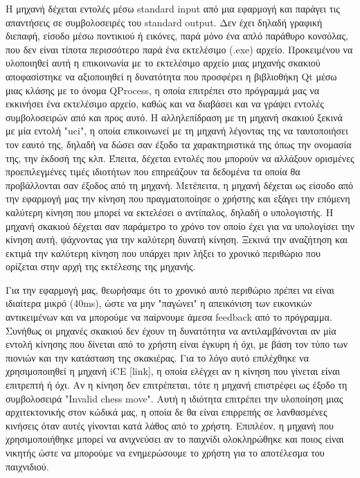 Η μηχανή δέχεται εντολές μέσω standard input από μια εφαρμογή και παράγει τις απαντήσεις σε συμβολοσειρές του standard output. Δεν έχει δηλαδή γραφική διεπαφή, είσοδο μέσω ποντικιού ή εικόνες, παρά μόνο ένα απλό παράθυρο κονσόλας, που δεν είναι τίποτα περισσότερο παρά ένα εκτελέσιμο (.exe) αρχείο. Προκειμένου να υλοποιηθεί αυτή η επικοινωνία με το εκτελέσιμο αρχείο μιας μηχανής σκακιού αποφασίστηκε να αξιοποιηθεί η δυνατότητα που προσφέρει η βιβλιοθήκη Qt μέσω μιας κλάσης με το όνομα QProcess, η οποία επιτρέπει στο πρόγραμμά μας να εκκινήσει ένα εκτελέσιμο αρχείο, καθώς και να διαβάσει και να γράψει εντολές συμβολοσειρών από και προς αυτό. Η αλληλεπίδραση με τη μηχανή σκακιού ξεκινά με μία εντολή "uci", η οποία επικοινωνεί με τη μηχανή λέγοντας της να ταυτοποιήσει τον εαυτό της, δηλαδή να δώσει σαν έξοδο τα χαρακτηριστικά της όπως την ονομασία της, την έκδοσή της κλπ.  Έπειτα, δέχεται εντολές που μπορούν να αλλάξουν ορισμένες προεπιλεγμένες τιμές ιδιοτήτων που επηρεάζουν τα δεδομένα τα οποία θα προβάλλονται σαν έξοδος από τη μηχανή. Μετέπειτα, η μηχανή δέχεται ως είσοδο από την εφαρμογή μας την κίνηση που πραγματοποίησε ο χρήστης και εξάγει την επόμενη καλύτερη κίνηση που μπορεί να εκτελέσει ο αντίπαλος, δηλαδή ο υπολογιστής.
Η μηχανή σκακιού δέχεται σαν παράμετρο το χρόνο τον οποίο έχει για να υπολογίσει την κίνηση αυτή, ψάχνοντας για την καλύτερη δυνατή κίνηση. Ξεκινά την αναζήτηση και εκτιμά την καλύτερη κίνηση που υπάρχει πριν λήξει το χρονικό περιθώριο που ορίζεται στην αρχή της εκτέλεσης της μηχανής. 

Για την εφαρμογή μας, θεωρήσαμε ότι το χρονικό αυτό περιθώριο πρέπει να είναι ιδιαίτερα μικρό (40ms), ώστε να μην "παγώνει" η απεικόνιση των εικονικών αντικειμένων και να μπορούμε να παίρνουμε άμεσα feedback από το πρόγραμμα. Συνήθως οι μηχανές σκακιού δεν έχουν τη δυνατότητα να αντιλαμβάνονται αν μία εντολή κίνησης που δίνεται από το χρήστη είναι έγκυρη ή όχι, με βάση τον τύπο των πιονιών και την κατάσταση της σκακιέρας. Για το λόγο αυτό επιλέχθηκε να χρησιμοποιηθεί η μηχανή iCE [link], η οποία ελέγχει αν η κίνηση που γίνεται είναι επιτρεπτή ή όχι. Αν η κίνηση δεν επιτρέπεται, τότε η μηχανή επιστρέφει ως έξοδο τη συμβολοσειρά "Invalid chess move". Αυτή η ιδιότητα επιτρέπει την υλοποίηση μιας αρχιτεκτονικής στον κώδικά μας, η οποία δε θα είναι επιρρεπής σε λανθασμένες κινήσεις όταν αυτές γίνονται κατά λάθος από το χρήστη. Επιπλέον, η μηχανή που χρησιμοποιήθηκε μπορεί να ανιχνεύσει αν το παιχνίδι ολοκληρώθηκε και ποιος είναι νικητής ώστε να μπορούμε να ενημερώσουμε το χρήστη για το αποτέλεσμα του παιχνιδιού. 

